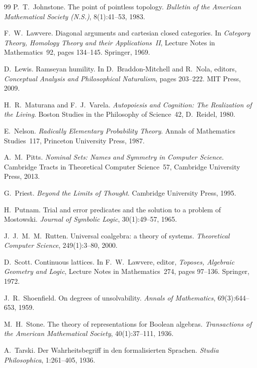 \documentclass[]{article}
\theoremstyle{definition}
\theoremstyle{remark}
\begin{document}
\begin{thebibliography}{99}
 P.~T.~Johnstone. The point of pointless topology. \emph{Bulletin of the
American Mathematical Society (N.S.)}, 8(1):41--53, 1983.

 F.~W.~Lawvere. Diagonal arguments and cartesian closed categories. In
\emph{Category Theory, Homology Theory and their Applications~II}, Lecture Notes in Mathematics~92,
pages 134--145. Springer, 1969.

 D.~Lewis. Ramseyan humility. In D.~Braddon-Mitchell and R.~Nola, editors,
\emph{Conceptual Analysis and Philosophical Naturalism}, pages 203--222. MIT Press, 2009.

 H.~R.~Maturana and F.~J.~Varela. \emph{Autopoiesis and Cognition: The
Realization of the Living}. Boston Studies in the Philosophy of Science~42, D.~Reidel, 1980.

 E.~Nelson. \emph{Radically Elementary Probability Theory}. Annals of Mathematics
Studies~117, Princeton University Press, 1987.

 A.~M.~Pitts. \emph{Nominal Sets: Names and Symmetry in Computer Science}.
Cambridge Tracts in Theoretical Computer Science~57, Cambridge University Press, 2013.

 G.~Priest. \emph{Beyond the Limits of Thought}. Cambridge University Press,
1995.

 H.~Putnam. Trial and error predicates and the solution to a problem of
Mostowski. \emph{Journal of Symbolic Logic}, 30(1):49--57, 1965.

 J.~J.~M.~M.~Rutten. Universal coalgebra: a theory of systems.
\emph{Theoretical Computer Science}, 249(1):3--80, 2000.

 D.~Scott. Continuous lattices. In F.~W.~Lawvere, editor, \emph{Toposes, Algebraic
Geometry and Logic}, Lecture Notes in Mathematics~274, pages 97--136. Springer, 1972.

 J.~R.~Shoenfield. On degrees of unsolvability. \emph{Annals of Mathematics},
69(3):644--653, 1959.

 M.~H.~Stone. The theory of representations for Boolean algebras.
\emph{Transactions of the American Mathematical Society}, 40(1):37--111, 1936.

 A.~Tarski. Der Wahrheitsbegriff in den formalisierten Sprachen. \emph{Studia
Philosophica}, 1:261--405, 1936.


\end{thebibliography}
\end{document}
